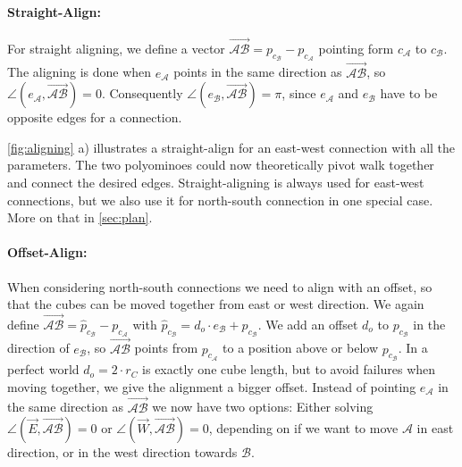 \paragraph{Straight-Align:}

For straight aligning, we define a vector $\overrightarrow{\mathcal{A}\mathcal{B}} = p_{c_\mathcal{B}} - p_{c_\mathcal{A}}$ pointing form $c_\mathcal{A}$ to $c_\mathcal{B}$.
The aligning is done when $e_\mathcal{A}$ points in the same direction as $\overrightarrow{\mathcal{A}\mathcal{B}}$, so $\angle \left( e_\mathcal{A}, \overrightarrow{\mathcal{A}\mathcal{B}} \right) = 0$.
Consequently $\angle \left( e_\mathcal{B}, \overrightarrow{\mathcal{A}\mathcal{B}} \right) = \pi$, since $e_\mathcal{A}$ and $e_\mathcal{B}$ have to be opposite edges for a connection.

\autoref{fig:aligning} a) illustrates a straight-align for an east-west connection with all the parameters.
The two polyominoes could now theoretically pivot walk together and connect the desired edges.
Straight-aligning is always used for east-west connections, but we also use it for north-south connection in one special case. More on that in \autoref{sec:plan}.

\paragraph{Offset-Align:}

When considering north-south connections we need to align with an offset, so that the cubes can be moved together from east or west direction.
We again define $\overrightarrow{\mathcal{A}\mathcal{B}} = \hat{p}_{c_\mathcal{B}} - p_{c_\mathcal{A}}$ with $\hat{p}_{c_\mathcal{B}} = d_o \cdot e_\mathcal{B} + p_{c_\mathcal{B}}$.
We add an offset $d_o$ to $p_{c_\mathcal{B}}$ in the direction of $e_\mathcal{B}$, so $\overrightarrow{\mathcal{A}\mathcal{B}}$ points from $p_{c_\mathcal{A}}$ to a position above or below $p_{c_\mathcal{B}}$.
In a perfect world $d_o = 2 \cdot r_C$ is exactly one cube length, but to avoid failures when moving together, we give the alignment a bigger offset.
Instead of pointing $e_\mathcal{A}$ in the same direction as $\overrightarrow{\mathcal{A}\mathcal{B}}$ we now have two options:
Either solving $\angle \left( \vec{E}, \overrightarrow{\mathcal{A}\mathcal{B}} \right) = 0$ or $\angle \left( \vec{W}, \overrightarrow{\mathcal{A}\mathcal{B}} \right) = 0$, depending on if we want to move $\mathcal{A}$ in east direction, or in the west direction towards $\mathcal{B}$.

